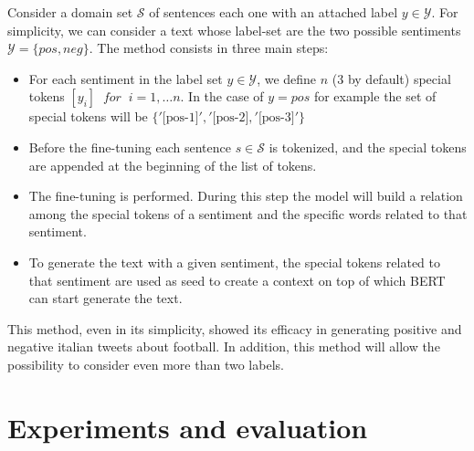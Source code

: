 \documentclass[10pt,twocolumn,letterpaper]{article}
\begin{document}
Consider a domain set $\mathcal S$ of sentences each one with an attached label $y\in \mathcal Y$.
For simplicity, we can consider a text whose label-set are the two possible sentiments $\mathcal Y =\{pos, neg\}$.
The method consists in three main steps:

\begin{itemize}
\item For each sentiment in the label set $y\in\mathcal Y$, we define $n$ (3 by default) special tokens $[y_i]\;\; for\;\;i=1,\ldots n$.
In the case of $y=pos$ for example the set of special tokens will be $\{'\text{[pos-1]}', '\text{[pos-2]}, '\text{[pos-3]}'\}$
\item Before the fine-tuning each sentence $s\in\mathcal S$ is tokenized, and the special tokens are appended at the beginning of the list of tokens.
\item The fine-tuning is performed. During this step the model will build a relation among the special tokens of a sentiment and the specific words
related to that sentiment.
\item To generate the text with a given sentiment, the special tokens related to that sentiment are used as seed to create a context on top of which BERT can start generate the text.

\end{itemize}

This method, even in its simplicity, showed its efficacy in generating positive and negative italian tweets about football.
In addition, this method will allow the possibility to consider even more than two labels.

\section{Experiments and evaluation}
\end{document}
